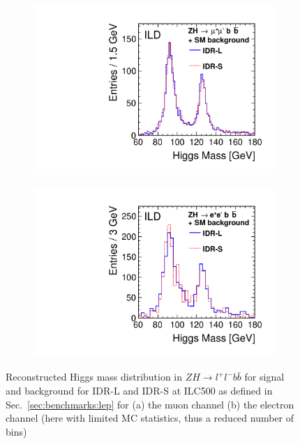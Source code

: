 \begin{figure}[htbp]
\begin{subfigure}{0.49\hsize} \includegraphics[width=\textwidth]{Performance/fig/mH_e2e2h_bb_eLpR_IDR.pdf}
 \caption{ \label{fig:mh:mass:mumu}}
 \end{subfigure}
\begin{subfigure}{0.49\hsize} \includegraphics[width=\textwidth]{Performance/fig/mH_e1e1h_bb_eLpR_IDR.pdf}
 \caption{  \label{fig:mh:mass:ee}}
 \end{subfigure}
\caption{Reconstructed Higgs mass distribution in $ZH \to l^+ l^- b\bar{b}$ for signal and background for IDR-L and IDR-S at ILC500 as defined in Sec.~\ref{sec:benchmarks:lep} for
(a) the muon channel
(b) the electron channel (here with limited MC statistics, thus a reduced number of bins)
}
\label{fig:mh:mass}
\end{figure}


